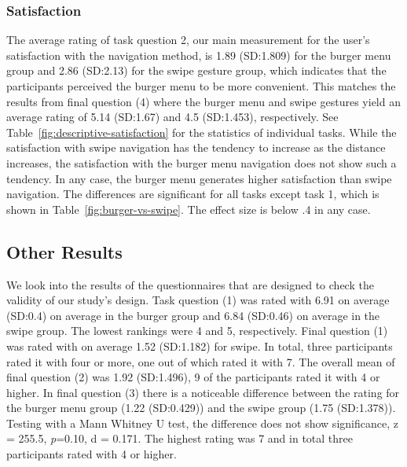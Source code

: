 \documentclass{sig-alternate-05-2015}
\begin{document}
\subsubsection{Satisfaction}
The average rating of task question 2, our main measurement for the user's satisfaction with the navigation method, is 1.89 (SD:\@1.809) for the burger menu group and 2.86 (SD:\@2.13)
for the swipe gesture group, which indicates that the participants perceived the burger menu to be more convenient. This matches the results from final question (4) 
where the burger menu and swipe gestures yield an average rating of 5.14  (SD:\@1.67) and 4.5 (SD:\@1.453), respectively.
See Table~\ref{fig:descriptive-satisfaction} for the statistics of individual tasks. While the satisfaction with swipe navigation has the tendency to increase as the distance increases,
the satisfaction with the burger menu navigation does not show such a tendency. In any case, the burger menu generates higher satisfaction than swipe navigation. The differences are 
significant for all tasks except task 1, which is shown in Table~\ref{fig:burger-vs-swipe}. The effect size is below .4 in any case.
\begin{table}[!h]
\centering
\caption{Mean (standard deviation) of satisfaction}
\label{fig:descriptive-satisfaction}
\end{table}

\subsection{Other Results}
We look into
the results of the questionnaires that are designed to check the validity of our study's design. Task question (1) was rated with
6.91 on average (SD:\@0.4) on average in the burger group and 6.84 (SD:\@0.46) on average in the swipe group. The lowest rankings were
4 and 5, respectively.
Final question (1) was rated with on average 1.52 (SD:\@1.182) for swipe. In total, three participants rated
it with four or more, one out of which rated it with 7. The overall mean of final question (2) was 1.92 (SD:\@1.496), 9 of the participants rated it
with 4 or higher. In final question (3) there is a noticeable difference between the rating for the burger menu group (1.22 (SD:\@0.429)) and the swipe group
(1.75 (SD:\@1.378)). Testing with a Mann Whitney U test, the difference does not show significance, z = 255.5, \emph{p}=0.10, d = 0.171. The highest rating was 7
and in total three participants rated with 4 or higher.
\end{document}

